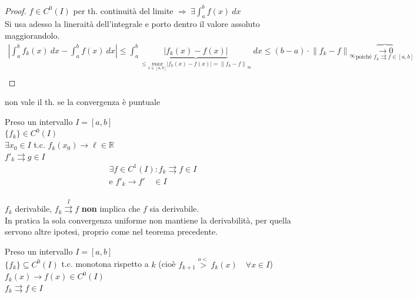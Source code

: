 \documentclass[a4paper, oneside]{article}
\begin{document}
\begin{proof}
  $f \in C^0 (I)$ per th. continuità del limite $\Rightarrow \ \exists \int_a^b f(x) \ dx$ \\
  Si usa adesso la lineraità dell'integrale e porto dentro il valore assoluto maggiorandolo.
  \begin{gather*}
    \left\lvert \int_a^b f_k(x) \ dx - \int_a^b f(x) \ dx \right\rvert  \leq \int_a^b \underbrace{\left\lvert f_k(x) - f(x) \right\rvert}_{\leq \underset{x \in [a,b]}{max} \left\lvert f_k(x) - f(x) \right\rvert = \left\lVert f_k - f \right\rVert_\infty  } \ dx \leq (b-a) \cdot \left\lVert f_k - f \right\rVert_\infty \overbrace{\to 0 }_{\text{poichè } f_k \rightrightarrows f \in [a,b]}\\
\end{gather*}
\end{proof}


\begin{observation}
  non vale il th. se la convergenza è puntuale
\end{observation}


\begin{theorem}
  Preso un intervallo $I = [a,b]$\\
   $\{f_k\} \in C^0 (I)$\\
   $\exists x_0 \in I $ t.c. $ f_k(x_0) \to \ell \in \mathbb{R}$\\
   $f'_k \rightrightarrows g \in I$\\
  \begin{gather*}
    \exists f \in C^1 (I) : f_k \rightrightarrows f \in I\\
    \text{e } f'_k \to f' \quad \in I\\
  \end{gather*}
\end{theorem}


\begin{observation}
  $f_k$ derivabile, $f_k \overset{I}{\rightrightarrows} f$ \textbf{non} implica che $f$ sia derivabile.\\
  In pratica la sola convergenza uniforme non mantiene la derivabilità, per quella servono altre ipotesi, proprio come nel teorema precedente.
\end{observation}


\begin{theorem}
  Preso un intervallo $I = [a,b]$\\
   $\{f_k\} \subseteq C^0 (I)$ t.c. monotona rispetto a $k$ (cioè $f_{k+1} \overset{o <}{>} f_k(x) \quad \forall x \in I$)\\
   $f_k(x) \to f(x) \in C^0 (I)$\\
   $f_k \rightrightarrows f \in I$
\end{theorem}
\end{document}
